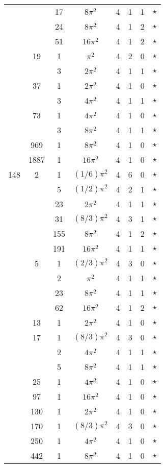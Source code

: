 \begin{tabular}{ccc|ccccc}
 &  & 17 & $8\pi^2$ & 4 & 1 & 1 & $\star$ \\
 &  & 24 & $8\pi^2$ & 4 & 1 & 2 & $\star$ \\
 &  & 51 & $16\pi^2$ & 4 & 1 & 2 & $\star$ \\
 & 19 & 1 & $\pi^2$ & 4 & 2 & 0 & $\star$ \\
 &  & 3 & $2\pi^2$ & 4 & 1 & 1 & $\star$ \\
 & 37 & 1 & $2\pi^2$ & 4 & 1 & 0 & $\star$ \\
 &  & 3 & $4\pi^2$ & 4 & 1 & 1 & $\star$ \\
 & 73 & 1 & $4\pi^2$ & 4 & 1 & 0 & $\star$ \\
 &  & 3 & $8\pi^2$ & 4 & 1 & 1 & $\star$ \\
 & 969 & 1 & $8\pi^2$ & 4 & 1 & 0 & $\star$ \\
 & 1887 & 1 & $16\pi^2$ & 4 & 1 & 0 & $\star$ \\
148 & 2 & 1 & $(1/6)\pi^2$ & 4 & 6 & 0 & $\star$ \\
 &  & 5 & $(1/2)\pi^2$ & 4 & 2 & 1 & $\star$ \\
 &  & 23 & $2\pi^2$ & 4 & 1 & 1 & $\star$ \\
 &  & 31 & $(8/3)\pi^2$ & 4 & 3 & 1 & $\star$ \\
 &  & 155 & $8\pi^2$ & 4 & 1 & 2 & $\star$ \\
 &  & 191 & $16\pi^2$ & 4 & 1 & 1 & $\star$ \\
 & 5 & 1 & $(2/3)\pi^2$ & 4 & 3 & 0 & $\star$ \\
 &  & 2 & $\pi^2$ & 4 & 1 & 1 & $\star$ \\
 &  & 23 & $8\pi^2$ & 4 & 1 & 1 & $\star$ \\
 &  & 62 & $16\pi^2$ & 4 & 1 & 2 & $\star$ \\
 & 13 & 1 & $2\pi^2$ & 4 & 1 & 0 & $\star$ \\
 & 17 & 1 & $(8/3)\pi^2$ & 4 & 3 & 0 & $\star$ \\
 &  & 2 & $4\pi^2$ & 4 & 1 & 1 & $\star$ \\
 &  & 5 & $8\pi^2$ & 4 & 1 & 1 & $\star$ \\
 & 25 & 1 & $4\pi^2$ & 4 & 1 & 0 & $\star$ \\
 & 97 & 1 & $16\pi^2$ & 4 & 1 & 0 & $\star$ \\
 & 130 & 1 & $2\pi^2$ & 4 & 1 & 0 & $\star$ \\
 & 170 & 1 & $(8/3)\pi^2$ & 4 & 3 & 0 & $\star$ \\
 & 250 & 1 & $4\pi^2$ & 4 & 1 & 0 & $\star$ \\
 & 442 & 1 & $8\pi^2$ & 4 & 1 & 0 & $\star$ \\

\end{tabular}
